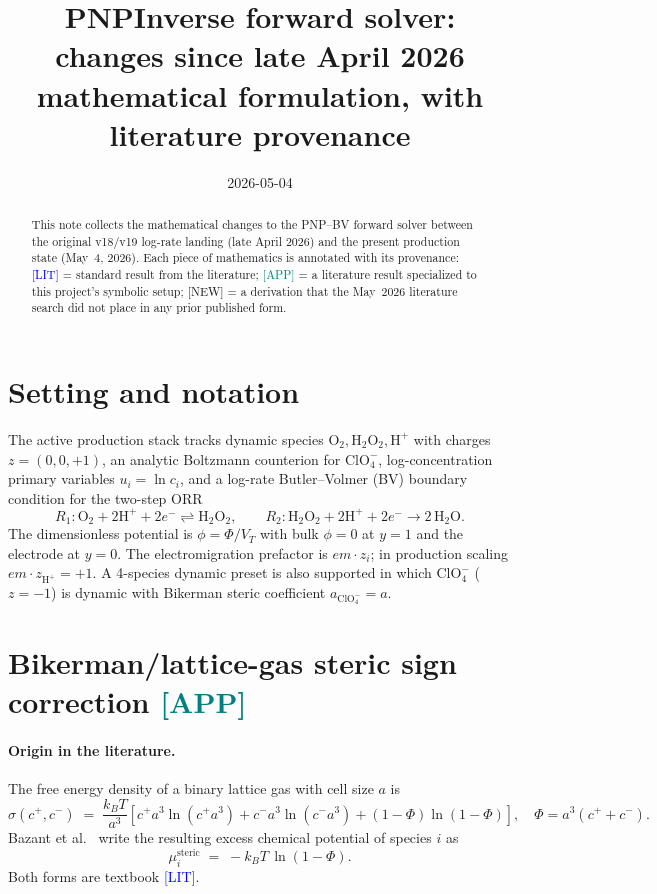 \documentclass[11pt]{article}
\title{PNPInverse forward solver: changes since late April 2026 \\
\large mathematical formulation, with literature provenance}
\author{}
\date{2026-05-04}
\newcommand{\lit}{\textcolor{blue}{[LIT]}}
\newcommand{\app}{\textcolor{teal}{[APP]}}
\newcommand{\new}{\textcolor{red!70!black}{[NEW]}}
\newcommand{\ClO}{\text{ClO}_4^-}
\newcommand{\Hp}{\text{H}^+}
\newcommand{\Otwo}{\text{O}_2}
\newcommand{\Htwo}{\text{H}_2\text{O}_2}
\newcommand{\msteric}{\mu^{\mathrm{steric}}}
\begin{document}
\maketitle

\begin{abstract}
This note collects the mathematical changes to the PNP--BV forward
solver between the original v18/v19 log-rate landing (late April 2026)
and the present production state (May~4, 2026).  Each piece of
mathematics is annotated with its provenance: \lit{} = standard result
from the literature; \app{} = a literature result specialized to this
project's symbolic setup; \new{} = a derivation that the May~2026
literature search did not place in any prior published form.
\end{abstract}

\tableofcontents

\section{Setting and notation}
\label{sec:setting}

The active production stack tracks dynamic species
$\Otwo, \Htwo, \Hp$ with charges $z=(0,0,+1)$, an analytic Boltzmann
counterion for $\ClO$, log-concentration primary variables
$u_i = \ln c_i$, and a log-rate Butler--Volmer (BV) boundary
condition for the two-step ORR
\[
  R_1: \Otwo + 2\Hp + 2e^- \rightleftharpoons \Htwo, \qquad
  R_2: \Htwo + 2\Hp + 2e^- \to 2\,\text{H}_2\text{O}.
\]
The dimensionless potential is $\phi = \Phi/V_T$ with bulk $\phi=0$ at
$y=1$ and the electrode at $y=0$.  The electromigration prefactor is
$em\cdot z_i$; in production scaling $em\cdot z_{\Hp} = +1$.
A 4-species dynamic preset is also supported in which $\ClO$
($z=-1$) is dynamic with Bikerman steric coefficient
$a_{\ClO} = a$.

\section{Bikerman/lattice-gas steric sign correction \app}
\label{sec:steric-sign}

\paragraph{Origin in the literature.}
The free energy density of a binary lattice gas with cell size $a$ is
\cite{borukhov1997}
\begin{equation}
  \sigma(c^+,c^-) \;=\; \frac{k_B T}{a^3}\!\left[
    c^+a^3\ln(c^+a^3)
    + c^-a^3\ln(c^-a^3)
    + (1-\Phi)\ln(1-\Phi)
  \right],\quad \Phi = a^3(c^++c^-).
  \label{eq:bao-entropy}
\end{equation}
Bazant et al.\ \cite{bazant2009} write the resulting excess chemical
potential of species $i$ as
\begin{equation}
  \msteric_i \;=\; -k_B T\,\ln(1-\Phi).
  \label{eq:bazant20}
\end{equation}
Both forms are textbook \lit{}.
\end{document}
